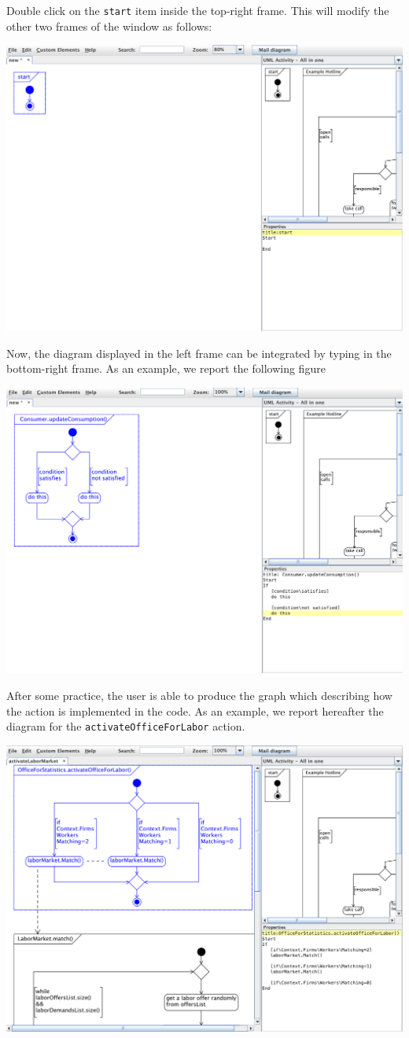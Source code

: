 \documentclass{book}
\begin{document}
Double click on the \verb+start+ item inside the top-right frame. This will modify the other two frames of the window as follows:

\includegraphics[scale=0.35]{fig_gabriele_umlet3.png}

Now, the diagram displayed in the left frame can be integrated by typing in the bottom-right frame. As an example, we report the following figure

\includegraphics[scale=0.35]{fig_gabriele_umlet4.png}

After some practice, the user is able to produce the graph which describing how the action is implemented in the code. As an example, we report hereafter the diagram for the \verb+activateOfficeForLabor+ action. 

\includegraphics[scale=0.35]{fig_gabriele_umlet5.png}
\end{document}
